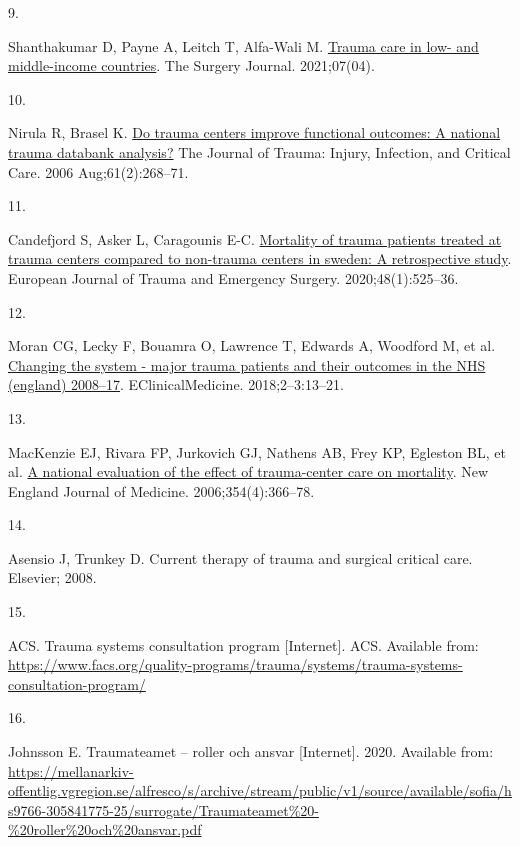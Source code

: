 \documentclass[
]{article}
\newlength{\cslhangindent}
\newlength{\csllabelwidth}
\newlength{\cslentryspacingunit} %
\newenvironment{CSLReferences}[2] %
 {%
  \setlength{\parindent}{0pt}
  \ifodd #1
  \let\oldpar\par
  \def\par{\hangindent=\cslhangindent\oldpar}
  \fi
  \setlength{\parskip}{#2\cslentryspacingunit}
 }%
 {}
\newcommand{\CSLLeftMargin}[1]{\parbox[t]{\csllabelwidth}{#1}}
\newcommand{\CSLRightInline}[1]{\parbox[t]{\linewidth - \csllabelwidth}{#1}\break}
\begin{document}
\begin{CSLReferences}{0}{0}
\leavevmode{}%
\CSLLeftMargin{9. }%
\CSLRightInline{Shanthakumar D, Payne A, Leitch T, Alfa-Wali M.
\href{https://doi.org/10.1055/s-0041-1732351}{Trauma care in low- and
middle-income countries}. The Surgery Journal. 2021;07(04). }

\leavevmode{}%
\CSLLeftMargin{10. }%
\CSLRightInline{Nirula R, Brasel K.
\href{https://doi.org/10.1097/01.ta.0000230305.36456.4e}{Do trauma
centers improve functional outcomes: A national trauma databank
analysis?} The Journal of Trauma: Injury, Infection, and Critical Care.
2006 Aug;61(2):268--71. }

\leavevmode{}%
\CSLLeftMargin{11. }%
\CSLRightInline{Candefjord S, Asker L, Caragounis E-C.
\href{https://doi.org/10.1007/s00068-020-01446-6}{Mortality of trauma
patients treated at trauma centers compared to non-trauma centers in
sweden: A retrospective study}. European Journal of Trauma and Emergency
Surgery. 2020;48(1):525--36. }

\leavevmode{}%
\CSLLeftMargin{12. }%
\CSLRightInline{Moran CG, Lecky F, Bouamra O, Lawrence T, Edwards A,
Woodford M, et al.
\href{https://doi.org/10.1016/j.eclinm.2018.07.001}{Changing the system
- major trauma patients and their outcomes in the NHS (england)
2008--17}. EClinicalMedicine. 2018;2--3:13--21. }

\leavevmode{}%
\CSLLeftMargin{13. }%
\CSLRightInline{MacKenzie EJ, Rivara FP, Jurkovich GJ, Nathens AB, Frey
KP, Egleston BL, et al. \href{https://doi.org/10.1056/nejmsa052049}{A
national evaluation of the effect of trauma-center care on mortality}.
New England Journal of Medicine. 2006;354(4):366--78. }

\leavevmode{}%
\CSLLeftMargin{14. }%
\CSLRightInline{Asensio J, Trunkey D. Current therapy of trauma and
surgical critical care. Elsevier; 2008. }

\leavevmode{}%
\CSLLeftMargin{15. }%
\CSLRightInline{ACS. Trauma systems consultation program {[}Internet{]}.
ACS. Available from:
\url{https://www.facs.org/quality-programs/trauma/systems/trauma-systems-consultation-program/}}

\leavevmode{}%
\CSLLeftMargin{16. }%
\CSLRightInline{Johnsson E. Traumateamet -- roller och ansvar
{[}Internet{]}. 2020. Available from:
\url{https://mellanarkiv-offentlig.vgregion.se/alfresco/s/archive/stream/public/v1/source/available/sofia/hs9766-305841775-25/surrogate/Traumateamet\%20-\%20roller\%20och\%20ansvar.pdf}}


\end{CSLReferences}
\end{document}
